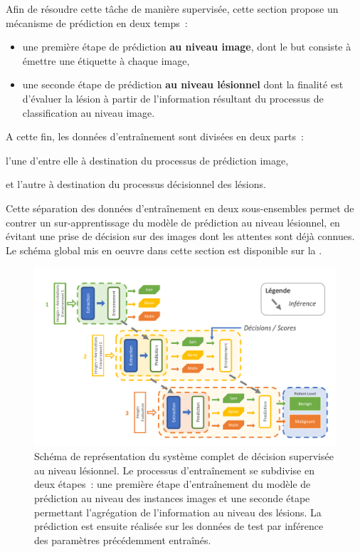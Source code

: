 Afin de résoudre cette tâche de manière supervisée, cette section propose un mécanisme de prédiction en deux temps~: 
\begin{itemize}
    \item une première étape de prédiction \textbf{au niveau image}, dont le but consiste à émettre une étiquette à chaque image,
    \item une seconde étape de prédiction \textbf{au niveau lésionnel} dont la finalité est d'évaluer la lésion à partir de l'information résultant du processus de classification au niveau image.
\end{itemize} A cette fin, les données d'entraînement sont divisées en deux parts~:
\begin{inlinerate}
    \item l'une d'entre elle à destination du processus de prédiction image,
    \item et l'autre à destination du processus décisionnel des lésions.
\end{inlinerate}
Cette séparation des données d'entraînement en deux sous-ensembles permet de contrer un sur-apprentissage du modèle de prédiction au niveau lésionnel, en évitant une prise de décision sur des images dont les attentes sont déjà connues. Le schéma global mis en oeuvre dans cette section est disponible sur la .\par

\begin{figure}[H]
    \centering
    \includegraphics[width=0.95\linewidth]{contents/chapter_7/resources/scheme_patient_decision.pdf}
    \caption{Schéma de représentation du système complet de décision supervisée au niveau lésionnel. Le processus d'entraînement se subdivise en deux étapes~: une première étape d'entraînement du modèle de prédiction au niveau des instances images et une seconde étape permettant l'agrégation de l'information au niveau des lésions. La prédiction est ensuite réalisée sur les données de test par inférence des paramètres précédemment entraînés.}
    \label{fig:scheme_patient_decision}
\end{figure}\par

